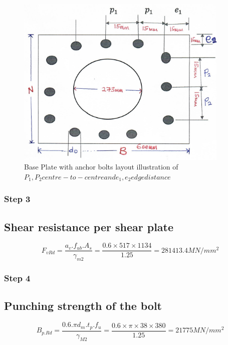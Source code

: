 {\begin{figure}
    \centering
\includegraphics[width=4in]{Figures/base plate design.jpg}
\caption{Base Plate with anchor bolts layout illustration of \(P_1, P_2 centre-to-centre and e_1,e_2 edge distance \)}
 \label{fig:3.20}
\end{figure}

\subsubsection{\textbf{Step 3}}

\subsection{Shear resistance per shear plate }

\begin{equation}
    F_{vRd}=\frac{a_v. f_{ub}. A_{s}}{\gamma_{m2}} = \frac{{0}.{6}\times{517}\times{1134}}{{1}.{25}}=281413.4MN/m{m}^{2}
\end{equation}


\subsubsection{\textbf{Step 4}}

\subsection{Punching strength of the bolt}


\begin{equation}
 B_{p.Rd} = \frac{0.6.\pi d_m.t_{p}.f_u}{\gamma_{M2}} =  \frac{0.6\times \pi \times38\times380}{1.25} = 21775MN/mm^2
\end{equation}

}
